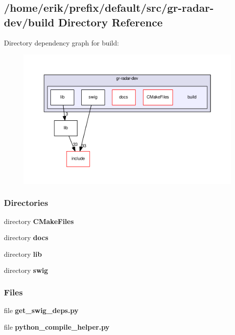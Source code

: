 \subsection{/home/erik/prefix/default/src/gr-\/radar-\/dev/build Directory Reference}
\label{dir_9005af1026b8772f1e96e9a6c408efb2}
Directory dependency graph for build\+:
\nopagebreak
\begin{figure}[H]
\begin{center}
\leavevmode
\includegraphics[width=350pt]{dir_9005af1026b8772f1e96e9a6c408efb2_dep}
\end{center}
\end{figure}
\subsubsection*{Directories}
\begin{DoxyCompactItemize}
\item 
directory {\bf C\+Make\+Files}
\item 
directory {\bf docs}
\item 
directory {\bf lib}
\item 
directory {\bf swig}
\end{DoxyCompactItemize}
\subsubsection*{Files}
\begin{DoxyCompactItemize}
\item 
file {\bf get\+\_\+swig\+\_\+deps.\+py}
\item 
file {\bf python\+\_\+compile\+\_\+helper.\+py}
\end{DoxyCompactItemize}
